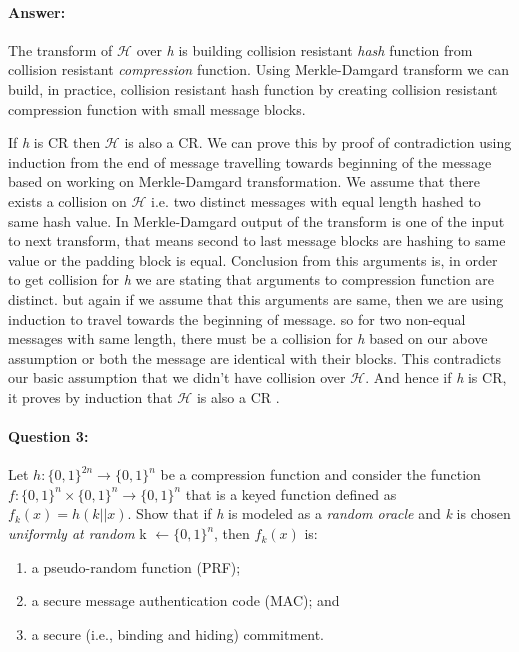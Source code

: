\documentclass{article}
\begin{document}
    \paragraph{Answer: \newline}
        The transform of $\mathcal{H}$ over \emph{h} is building collision resistant \emph{hash} function from collision resistant \emph{compression} function. Using Merkle-Damgard transform we can build, in practice, collision resistant hash function by creating collision resistant compression function with small message blocks.\newline
        
        If \emph{h} is CR then $\mathcal{H}$ is also a CR. We can prove this by proof of contradiction using induction from the end of message travelling towards beginning of the message based on working on Merkle-Damgard transformation. \newline
        We assume that there exists a collision on $\mathcal{H}$ i.e. two distinct messages with equal length hashed to same hash value. 
        In Merkle-Damgard output of the transform is one of the input to next transform, that means second to last message blocks are hashing to same value or the padding block is equal. Conclusion from this arguments is, in order to get collision for \emph{h} we are stating that arguments to compression function are distinct. but again if we assume that this arguments are same, then we are using induction to travel towards the beginning of message. so for two non-equal messages with same length, there must be a collision for \emph{h} based on our above assumption or both the message are identical with their blocks. This contradicts our basic assumption that we didn't have collision over $\mathcal{H}$. And hence if \emph{h} is CR, it proves by induction that $\mathcal{H}$ is also a CR \cite{mdpbyprofDanBoneh}.\newline
        
        
        
    \paragraph{Question 3:} Let $h:{\{0,1\}}^{2n} \rightarrow {\{0,1\}}^n$ be a compression function and consider the function $f:{\{0,1\}}^n \times{{\{0,1\}}^n} \rightarrow {\{0,1\}}^n$ that is a keyed function defined as $f_k{(x)} = h(k||x)$. Show that if \emph{h} is modeled as a \emph{random oracle} and \emph{k} is chosen \emph{uniformly at random} k $\leftarrow {\{0,1\}}^n$, then $f_k{(x)}$ is:
        \begin{enumerate}
            \item a pseudo-random function (PRF);
            \item a secure message authentication code (MAC); and
            \item a secure (i.e., binding and hiding) commitment.
        \end{enumerate}
        
\end{document}
